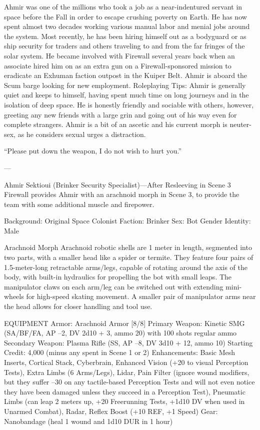 Ahmir was one of the millions who took a job as a near-indentured servant in space before the Fall in order to escape crushing poverty on Earth. He has now spent almost two decades working various manual labor and menial jobs around the system. Most recently, he has been hiring himself out as a bodyguard or as ship security for traders and others traveling to and from the far fringes of the solar system. He became involved with Firewall several years back when an associate hired him on as an extra gun on a Firewall-sponsored mission to eradicate an Exhuman faction outpost in the Kuiper Belt. Ahmir is aboard the Scum barge looking for new employment.
Roleplaying Tips: Ahmir is generally quiet and keeps to himself, having spent much time on long journeys and in the isolation of deep space. He is honestly friendly and sociable with others, however, greeting any new friends with a large grin and going out of his way even for complete strangers. Ahmir is a bit of an ascetic and his current morph is neuter-sex, as he considers sexual urges a distraction.

“Please put down the weapon, I do not wish to hurt you.”

---

Ahmir Sektioui (Brinker Security Specialist)—After Resleeving in Scene 3
Firewall provides Ahmir with an arachnoid morph in Scene 3, to provide the team with some additional muscle and firepower.

Background: Original Space Colonist
Faction: Brinker
Sex: Bot
Gender Identity: Male

Arachnoid Morph
Arachnoid robotic shells are 1 meter in length, segmented into two parts, with a smaller head like a spider or termite. They feature four pairs of 1.5-meter-long retractable arms/legs, capable of rotating around the axis of the body, with built-in hydraulics for propelling the bot with small leaps. The manipulator claws on each arm/leg can be switched out with extending mini-wheels for high-speed skating movement. A smaller pair of manipulator arms near the head allows for closer handling and tool use.

EQUIPMENT
Armor: Arachnoid Armor [8/8]
Primary Weapon: Kinetic SMG (SA/BF/FA, AP –2, DV 2d10 + 3, ammo 20) with 100 shots regular ammo
Secondary Weapon: Plasma Rifle (SS, AP –8, DV 3d10 + 12, ammo 10)
Starting Credit: 4,000 (minus any spent in Scene 1 or 2)
Enhancements: Basic Mesh Inserts, Cortical Stack, Cyberbrain, Enhanced Vision (+20 to visual Perception Tests), Extra Limbs (6 Arms/Legs), Lidar, Pain Filter (ignore wound modifiers, but they suffer –30 on any tactile-based Perception Tests and will not even notice they have been damaged unless they succeed in a Perception Test), Pneumatic Limbs (can leap 2 meters up, +20 Freerunning Tests, +1d10 DV when used in Unarmed Combat), Radar, Reflex Boost (+10 REF, +1 Speed)
Gear: Nanobandage (heal 1 wound and 1d10 DUR in 1 hour)

